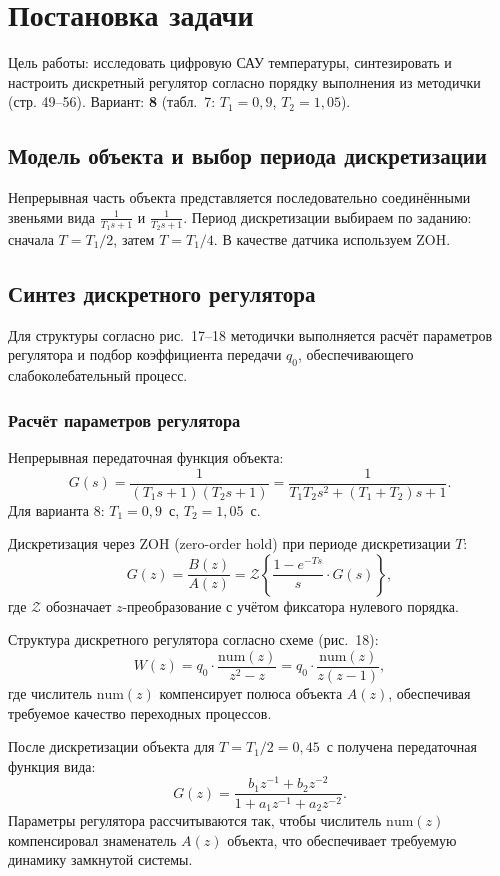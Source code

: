 
\chapter{Постановка задачи}
Цель работы: исследовать цифровую САУ температуры, синтезировать и настроить дискретный регулятор согласно порядку выполнения из методички (стр. 49–56). Вариант: \textbf{8} (табл.~7: $T_1=0{,}9$, $T_2=1{,}05$).

\section{Модель объекта и выбор периода дискретизации}
Непрерывная часть объекта представляется последовательно соединёнными звеньями вида $\frac{1}{T_1 s + 1}$ и $\frac{1}{T_2 s + 1}$.
Период дискретизации выбираем по заданию: сначала $T = T_1/2$, затем $T=T_1/4$. В качестве датчика используем ZOH.

\section{Синтез дискретного регулятора}
Для структуры согласно рис.~17–18 методички выполняется расчёт параметров регулятора и подбор коэффициента передачи $q_0$, обеспечивающего слабоколебательный процесс.

\subsection{Расчёт параметров регулятора}
Непрерывная передаточная функция объекта:
\[
G(s) = \frac{1}{(T_1 s + 1)(T_2 s + 1)} = \frac{1}{T_1 T_2 s^2 + (T_1 + T_2) s + 1}.
\]
Для варианта 8: $T_1 = 0{,}9$~с, $T_2 = 1{,}05$~с.

Дискретизация через ZOH (zero-order hold) при периоде дискретизации $T$:
\[
G(z) = \frac{B(z)}{A(z)} = \mathcal{Z}\left\{ \frac{1 - e^{-Ts}}{s} \cdot G(s) \right\},
\]
где $\mathcal{Z}$ обозначает $z$-преобразование с учётом фиксатора нулевого порядка.

Структура дискретного регулятора согласно схеме (рис.~18):
\[
W(z) = q_0 \cdot \frac{\text{num}(z)}{z^2 - z} = q_0 \cdot \frac{\text{num}(z)}{z(z-1)},
\]
где числитель $\text{num}(z)$ компенсирует полюса объекта $A(z)$, обеспечивая требуемое качество переходных процессов.

После дискретизации объекта для $T = T_1/2 = 0{,}45$~с получена передаточная функция вида:
\[
G(z) = \frac{b_1 z^{-1} + b_2 z^{-2}}{1 + a_1 z^{-1} + a_2 z^{-2}}.
\]
Параметры регулятора рассчитываются так, чтобы числитель $\text{num}(z)$ компенсировал знаменатель $A(z)$ объекта, что обеспечивает требуемую динамику замкнутой системы.

